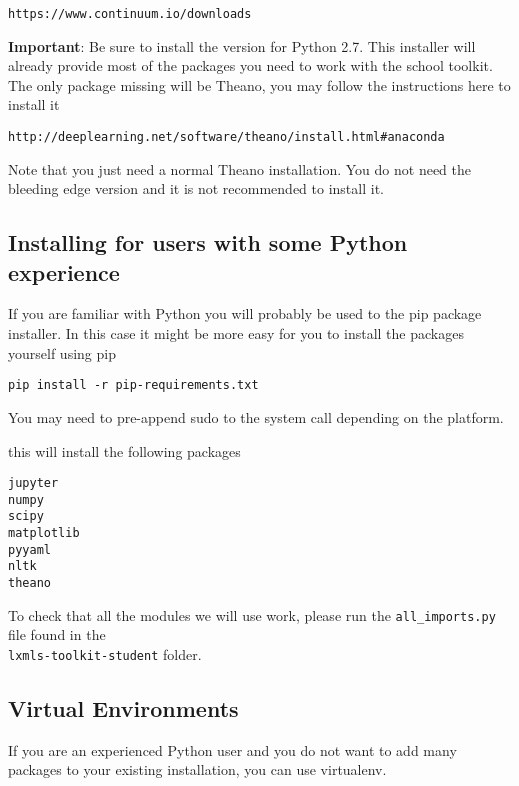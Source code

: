 \begin{verbatim}
https://www.continuum.io/downloads
\end{verbatim}

\textbf{Important}: Be sure to install the version for Python 2.7. This
installer will already provide most of the packages you need to work with the
school toolkit. The only package missing will be Theano, you may follow the
instructions here to install it

\begin{verbatim}
http://deeplearning.net/software/theano/install.html#anaconda
\end{verbatim}

\noindent Note that you just need a normal Theano installation. You do not 
need the bleeding edge version and it is not recommended to install it.

\subsection{Installing for users with some Python experience}

If you are familiar with Python you will probably be used to the pip package
installer. In this case it might be more easy for you to install the packages
yourself using pip

\begin{verbatim}
pip install -r pip-requirements.txt 
\end{verbatim}

You may need to pre-append sudo to the system call depending on the platform.

\noindent this will install the following packages

\begin{verbatim}
jupyter
numpy
scipy
matplotlib
pyyaml
nltk
theano 
\end{verbatim}

To check that all the modules we will use work, please run the
\verb+all_imports.py+ file found in the \\ \verb+lxmls-toolkit-student+ folder.


\subsection{Virtual Environments}

If you are an experienced Python user and you do not want to add many packages
to your existing installation, you can use virtualenv.

